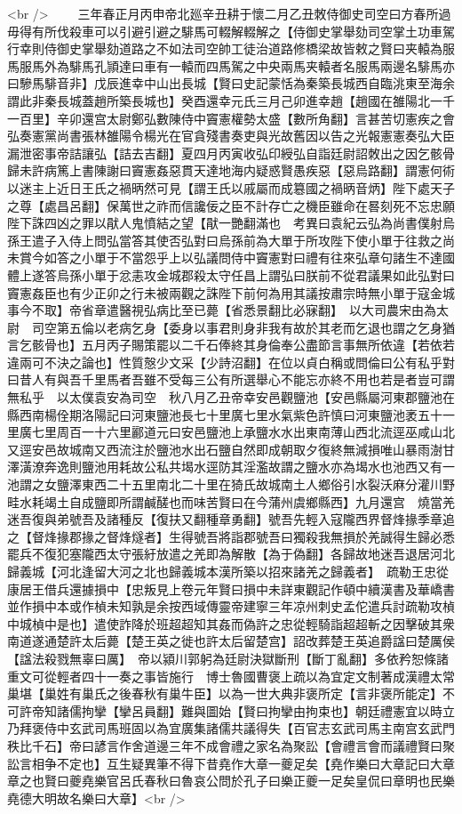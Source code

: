 <br />
　　三年春正月丙申帝北廵辛丑耕于懷二月乙丑敇侍御史司空曰方春所過毋得有所伐殺車可以引避引避之騑馬可輟解輟解之【侍御史掌舉劾司空掌土功車駕行幸則侍御史掌舉劾道路之不如法司空帥工徒治道路修橋梁故皆敕之賢曰夹轅為服馬服馬外為騑馬孔頴達曰車有一轅而四馬駕之中央兩馬夹轅者名服馬兩邊名騑馬亦曰驂馬騑音非】戊辰進幸中山出長城【賢曰史記蒙恬為秦築長城西自臨洮東至海余謂此非秦長城蓋趙所築長城也】癸酉還幸元氏三月己卯進幸趙【趙國在雒陽北一千一百里】辛卯還宫太尉鄭弘數陳侍中竇憲權勢太盛【數所角翻】言甚苦切憲疾之會弘奏憲黨尚書張林雒陽令楊光在官貪殘書奏吏與光故舊因以告之光報憲憲奏弘大臣漏泄密事帝詰讓弘【詰去吉翻】夏四月丙寅收弘印綬弘自詣廷尉詔敇出之因乞骸骨歸未許病篤上書陳謝曰竇憲姦惡貫天達地海内疑惑賢愚疾惡【惡烏路翻】謂憲何術以迷主上近日王氏之禍昞然可見【謂王氏以戚屬而成簒國之禍昞音炳】陛下處天子之尊【處昌呂翻】保萬世之祚而信讒佞之臣不計存亡之機臣雖命在晷刻死不忘忠願陛下誅四凶之罪以猒人鬼憤結之望【猒一艷翻滿也　考異曰袁紀云弘為尚書僕射烏孫王遣子入侍上問弘當答其使否弘對曰烏孫前為大單于所攻陛下使小單于往救之尚未賞今如答之小單于不當怨乎上以弘議問侍中竇憲對曰禮有往來弘章句諸生不達國體上遂答烏孫小單于忿恚攻金城郡殺太守任昌上謂弘曰朕前不從君議果如此弘對曰竇憲姦臣也有少正卯之行未被兩觀之誅陛下前何為用其議按肅宗時無小單于寇金城事今不取】帝省章遣醫視弘病比至已薨【省悉景翻比必寐翻】　以大司農宋由為太尉　司空第五倫以老病乞身【委身以事君則身非我有故於其老而乞退也謂之乞身猶言乞骸骨也】五月丙子賜策罷以二千石俸終其身倫奉公盡節言事無所依違【若依若違兩可不決之論也】性質慤少文采【少詩沼翻】在位以貞白稱或問倫曰公有私乎對曰昔人有與吾千里馬者吾雖不受每三公有所選舉心不能忘亦終不用也若是者豈可謂無私乎　以太僕袁安為司空　秋八月乙丑帝幸安邑觀鹽池【安邑縣屬河東郡鹽池在縣西南楊佺期洛陽記曰河東鹽池長七十里廣七里水氣紫色許慎曰河東鹽池袤五十一里廣七里周百一十六里酈道元曰安邑鹽池上承鹽水水出東南薄山西北流逕巫咸山北又逕安邑故城南又西流注於鹽池水出石鹽自然即成朝取夕復終無減損唯山暴雨澍甘澤潢潦奔逸則鹽池用耗故公私共堨水逕防其淫濫故謂之鹽水亦為堨水也池西又有一池謂之女鹽澤東西二十五里南北二十里在猗氏故城南土人鄉俗引水裂沃麻分灌川野畦水耗竭土自成鹽即所謂鹹醝也而味苦賢曰在今蒲州虞鄉縣西】九月還宫　燒當羌迷吾復與弟號吾及諸種反【復扶又翻種章勇翻】號吾先輕入寇隴西界督烽掾季章追之【督烽掾郡掾之督烽燧者】生得號吾將詣郡號吾曰獨殺我無損於羌誠得生歸必悉罷兵不復犯塞隴西太守張紆放遣之羌即為解散【為于偽翻】各歸故地迷吾退居河北歸義城【河北逢留大河之北也歸義城本漢所築以招來諸羌之歸義者】　疏勒王忠從康居王借兵還據損中【忠叛見上卷元年賢曰損中未詳東觀記作頓中續漢書及華嶠書並作損中本或作楨未知孰是余按西域傳靈帝建寧三年凉州刺史孟佗遣兵討疏勒攻楨中城楨中是也】遣使詐降於班超超知其姦而偽許之忠從輕騎詣超超斬之因擊破其衆南道遂通楚許太后薨【楚王英之徙也許太后留楚宫】詔改葬楚王英追爵諡曰楚厲侯【諡法殺戮無辜曰厲】　帝以潁川郭躬為廷尉決獄斷刑【斷丁亂翻】多依矜恕條諸重文可從輕者四十一奏之事皆施行　博士魯國曹褒上疏以為宜定文制著成漢禮太常巢堪【巢姓有巢氏之後春秋有巢牛臣】以為一世大典非褒所定【言非褒所能定】不可許帝知諸儒拘攣【攣呂員翻】難與圖始【賢曰拘攣由拘束也】朝廷禮憲宜以時立乃拜褒侍中玄武司馬班固以為宜廣集諸儒共議得失【百官志玄武司馬主南宫玄武門秩比千石】帝曰諺言作舍道邊三年不成會禮之家名為聚訟【會禮言會而議禮賢曰聚訟言相争不定也】互生疑異筆不得下昔堯作大章一夔足矣【堯作樂曰大章記曰大章章之也賢曰夔堯樂官呂氏春秋曰魯哀公問於孔子曰樂正夔一足矣皇侃曰章明也民樂堯德大明故名樂曰大章】<br />
